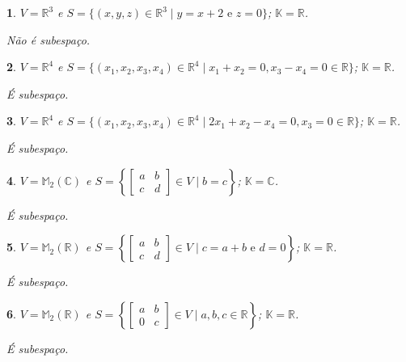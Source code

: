 \documentclass[12pt]{exam}
\newtheorem{exercicio}{}
\newcommand{\real}{\mathbb{R}}
\newcommand{\complex}{\mathbb{C}}
\newcommand{\cp}[1]{\mathbb{#1}}
\begin{document}
\begin{exercicio}
$V = \real^3$ e $S = \{(x, y, z) \in \real^3 \mid y = x + 2 \mbox{ e } z = 0\}$; $\cp{K} = \real$.
\begin{solucao}
  N\~ao \'e subespa\c{c}o.
\end{solucao}
\end{exercicio}

\begin{exercicio}
$V = \real^4$ e $S = \{(x_1, x_2, x_3, x_4) \in \real^4 \mid x_1 + x_2 = 0, x_3 - x_4 = 0 \in \real\}$; $\cp{K} = \real$.
\begin{solucao}
  \'E subespa\c{c}o.
\end{solucao}
\end{exercicio}

\begin{exercicio}
$V = \real^4$ e $S = \{(x_1, x_2, x_3, x_4) \in \real^4 \mid 2x_1 + x_2 - x_4 = 0, x_3 = 0 \in \real\}$; $\cp{K} = \real$.
\begin{solucao}
  \'E subespa\c{c}o.
\end{solucao}
\end{exercicio}

\begin{exercicio}
$V = \cp{M}_2(\complex)$ e $S = \left\{\begin{bmatrix} a & b\\ c & d\end{bmatrix} \in V \mid b = c\right\}$; $\cp{K} = \complex$.
\begin{solucao}
  \'E subespa\c{c}o.
\end{solucao}
\end{exercicio}

\begin{exercicio}
$V = \cp{M}_2(\real)$ e $S = \left\{\begin{bmatrix} a & b\\ c & d\end{bmatrix} \in V \mid c = a + b \mbox{ e } d = 0\right\}$; $\cp{K} = \real$.
\begin{solucao}
  \'E subespa\c{c}o.
\end{solucao}
\end{exercicio}

\begin{exercicio}
$V = \cp{M}_2(\real)$ e $S = \left\{\begin{bmatrix} a & b\\ 0 & c\end{bmatrix} \in V \mid a, b, c \in \real\right\}$; $\cp{K} = \real$.
\begin{solucao}
  \'E subespa\c{c}o.
\end{solucao}
\end{exercicio}
\end{document}
